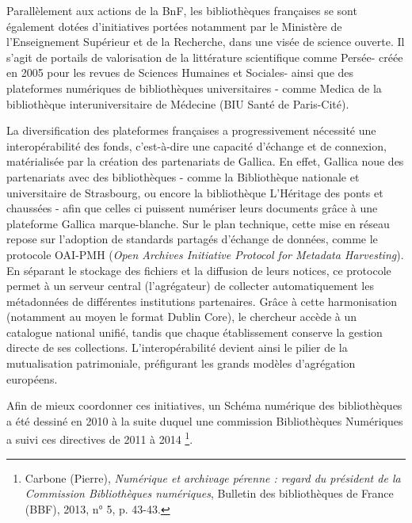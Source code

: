 Parallèlement aux actions de la BnF, les bibliothèques françaises se sont également dotées d’initiatives portées notamment par le Ministère de l’Enseignement Supérieur et de la Recherche, dans une visée de science ouverte. Il s’agit de portails de valorisation de la littérature scientifique comme Persée- créée en 2005 pour les revues de Sciences Humaines et Sociales- ainsi que des plateformes numériques de  bibliothèques universitaires - comme Medica de la bibliothèque interuniversitaire de Médecine (BIU Santé de Paris-Cité).

\medskip La diversification des plateformes françaises a progressivement nécessité une interopérabilité des fonds, c’est-à-dire une capacité d’échange et de connexion, matérialisée par la création des partenariats de Gallica. 
En effet, Gallica noue des partenariats avec des bibliothèques - comme la Bibliothèque nationale et universitaire de Strasbourg, ou encore la bibliothèque L’Héritage des ponts et chaussées - afin que celles ci puissent numériser leurs documents grâce à une plateforme Gallica marque-blanche. 
Sur le plan technique, cette mise en réseau repose sur l'adoption de standards partagés d'échange de données, comme le protocole OAI-PMH (\textit{Open Archives Initiative Protocol for Metadata Harvesting}). 
En séparant le stockage des fichiers et la diffusion de leurs notices, ce protocole permet à un serveur central (l'agrégateur) de collecter automatiquement les métadonnées de différentes institutions partenaires. Grâce à cette harmonisation (notamment au moyen le format Dublin Core), le chercheur accède à un catalogue national unifié, tandis que chaque établissement conserve la gestion directe de ses collections. L'interopérabilité devient ainsi le pilier de la mutualisation patrimoniale, préfigurant les grands modèles d'agrégation européens. 

Afin de mieux coordonner ces initiatives, un Schéma numérique des bibliothèques a été dessiné en 2010 à la suite duquel une commission Bibliothèques Numériques a suivi ces directives de 2011 à 2014
\footnote{Carbone (Pierre), \textit{Numérique et archivage pérenne : regard du président de la Commission Bibliothèques numériques}, Bulletin des bibliothèques de France (BBF), 2013, n° 5, p. 43-43.}.

